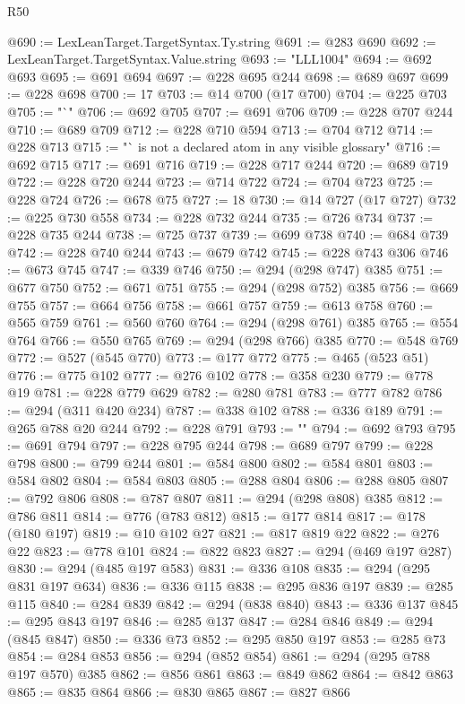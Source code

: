 \begin{lexlean}{R50}
\begin{coremodule}
@690 := LexLeanTarget.TargetSyntax.Ty.string
@691 := @283 @690
@692 := LexLeanTarget.TargetSyntax.Value.string
@693 := "LLL1004"
@694 := @692 @693
@695 := @691 @694
@697 := @228 @695 @244
@698 := @689 @697
@699 := @228 @698
@700 := 17
@703 := @14 @700 (@17 @700)
@704 := @225 @703
@705 := "`"
@706 := @692 @705
@707 := @691 @706
@709 := @228 @707 @244
@710 := @689 @709
@712 := @228 @710 @594
@713 := @704 @712
@714 := @228 @713
@715 := "` is not a declared atom in any visible glossary"
@716 := @692 @715
@717 := @691 @716
@719 := @228 @717 @244
@720 := @689 @719
@722 := @228 @720 @244
@723 := @714 @722
@724 := @704 @723
@725 := @228 @724
@726 := @678 @75
@727 := 18
@730 := @14 @727 (@17 @727)
@732 := @225 @730 @558
@734 := @228 @732 @244
@735 := @726 @734
@737 := @228 @735 @244
@738 := @725 @737
@739 := @699 @738
@740 := @684 @739
@742 := @228 @740 @244
@743 := @679 @742
@745 := @228 @743 @306
@746 := @673 @745
@747 := @339 @746
@750 := @294 (@298 @747) @385
@751 := @677 @750
@752 := @671 @751
@755 := @294 (@298 @752) @385
@756 := @669 @755
@757 := @664 @756
@758 := @661 @757
@759 := @613 @758
@760 := @565 @759
@761 := @560 @760
@764 := @294 (@298 @761) @385
@765 := @554 @764
@766 := @550 @765
@769 := @294 (@298 @766) @385
@770 := @548 @769
@772 := @527 (@545 @770)
@773 := @177 @772
@775 := @465 (@523 @51)
@776 := @775 @102
@777 := @276 @102
@778 := @358 @230
@779 := @778 @19
@781 := @228 @779 @629
@782 := @280 @781
@783 := @777 @782
@786 := @294 (@311 @420 @234)
@787 := @338 @102
@788 := @336 @189
@791 := @265 @788 @20 @244
@792 := @228 @791
@793 := ""
@794 := @692 @793
@795 := @691 @794
@797 := @228 @795 @244
@798 := @689 @797
@799 := @228 @798
@800 := @799 @244
@801 := @584 @800
@802 := @584 @801
@803 := @584 @802
@804 := @584 @803
@805 := @288 @804
@806 := @288 @805
@807 := @792 @806
@808 := @787 @807
@811 := @294 (@298 @808) @385
@812 := @786 @811
@814 := @776 (@783 @812)
@815 := @177 @814
@817 := @178 (@180 @197)
@819 := @10 @102 @27
@821 := @817 @819 @22
@822 := @276 @22
@823 := @778 @101
@824 := @822 @823
@827 := @294 (@469 @197 @287)
@830 := @294 (@485 @197 @583)
@831 := @336 @108
@835 := @294 (@295 @831 @197 @634)
@836 := @336 @115
@838 := @295 @836 @197
@839 := @285 @115
@840 := @284 @839
@842 := @294 (@838 @840)
@843 := @336 @137
@845 := @295 @843 @197
@846 := @285 @137
@847 := @284 @846
@849 := @294 (@845 @847)
@850 := @336 @73
@852 := @295 @850 @197
@853 := @285 @73
@854 := @284 @853
@856 := @294 (@852 @854)
@861 := @294 (@295 @788 @197 @570) @385
@862 := @856 @861
@863 := @849 @862
@864 := @842 @863
@865 := @835 @864
@866 := @830 @865
@867 := @827 @866

\end{coremodule}
\end{lexlean}
